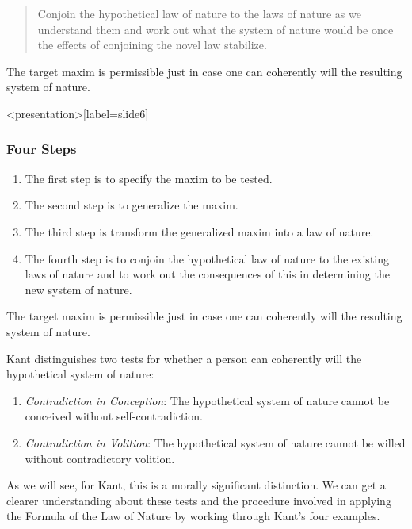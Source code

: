\begin{quote}
	Conjoin the hypothetical law of nature to the laws of nature as we understand them and work out what the system of nature would be once the effects of conjoining the novel law stabilize.
\end{quote}

The target maxim is permissible just in case one can coherently will the resulting system of nature. \change

\begin{frame}<presentation>[label=slide6]
    \frametitle{Four Steps}
        \begin{enumerate}
            \item The first step is to specify the maxim to be tested.
            \item The second step is to generalize the maxim.
            \item The third step is transform the generalized maxim into a law of nature.
            \item The fourth step is to conjoin the hypothetical law of nature to the existing laws of nature and to work out the consequences of this in determining the new system of nature.
        \end{enumerate}
        \alert{The target maxim is permissible just in case one can coherently will the resulting system of nature.}
\end{frame}

Kant distinguishes two tests for whether a person can coherently will the hypothetical system of nature:

\begin{enumerate}
	\item \emph{Contradiction in Conception}: The hypothetical system of nature cannot be conceived without self-contradiction.
    \item \emph{Contradiction in Volition}: The hypothetical system of nature cannot be willed without contradictory volition.
\end{enumerate}

As we will see, for Kant, this is a morally significant distinction. We can get a clearer understanding about these tests and the procedure involved in applying the Formula of the Law of Nature by working through Kant's four examples. \change

